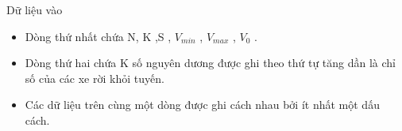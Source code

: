 Dữ liệu vào  
\begin{itemize}
	\item     Dòng thứ nhất chứa N, K ,S , $V_{min}$    , $V_{max}$    , $V_{0}$    .   
	\item     Dòng thứ hai chứa K số nguyên dương được ghi theo thứ tự tăng dần là chỉ số của các xe rời khỏi tuyến.   
	\item     Các dữ liệu trên cùng một dòng được ghi cách nhau bởi ít nhất một dấu cách.   
\end{itemize}